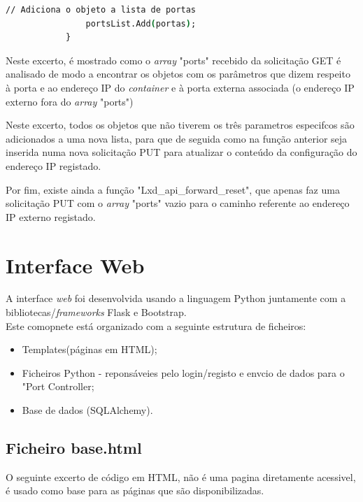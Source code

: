 \begin{lstlisting}[language=csh, caption={Edição do objeto Json "ports" para remover contúdo especificado}]
                // Adiciona o objeto a lista de portas
                portsList.Add(portas);
            }
\end{lstlisting} 

Neste excerto, é mostrado como o \textit{array} "ports" recebido da solicitação GET é analisado
de modo a encontrar os objetos com os parâmetros que dizem respeito à porta e ao endereço IP do 
\textit{container} e à porta externa associada (o endereço IP externo fora 
do \textit{array} "ports")

Neste excerto, todos os objetos que não tiverem os três parametros especifcos são adicionados
a uma nova lista, para que de seguida como na função anterior seja inserida numa nova
solicitação PUT para atualizar o conteúdo da configuração do endereço IP registado.

Por fim, existe ainda a função "Lxd\_api\_forward\_reset", que apenas faz uma solicitação
PUT com o \textit{array} "ports" vazio para o caminho referente ao endereço IP externo registado.




\section{Interface Web}

A interface \textit{web} foi desenvolvida usando a linguagem Python juntamente com
a bibliotecas/\textit{frameworks} Flask e Bootstrap. \\

Este comopnete está organizado com a seguinte estrutura de ficheiros:
\begin{itemize}
    \item Templates(páginas em HTML);
    \item Ficheiros Python - reponsáveies pelo login/registo e envcio de dados para o "Port Controller;
    \item Base de dados (SQLAlchemy).
\end{itemize}



\subsection{Ficheiro base.html}

O seguinte excerto de código em HTML, não é uma pagina diretamente acessivel, é 
usado como base para as páginas que são disponibilizadas.


